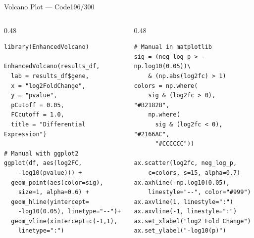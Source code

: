 \documentclass[10pt]{beamer}
\newcommand{\smark}[1]{\hfill{\scriptsize\color{codegray}#1}}
\begin{document}
\begin{frame}[fragile]{Volcano Plot --- Code}\smark{196/300}
\begin{columns}[T]
\begin{column}{0.48\textwidth}
\begin{lstlisting}[style=Rstyle]
library(EnhancedVolcano)

EnhancedVolcano(results_df,
  lab = results_df$gene,
  x = "log2FoldChange",
  y = "pvalue",
  pCutoff = 0.05,
  FCcutoff = 1.0,
  title = "Differential Expression")

# Manual with ggplot2
ggplot(df, aes(log2FC,
    -log10(pvalue))) +
  geom_point(aes(color=sig),
    size=1, alpha=0.6) +
  geom_hline(yintercept=
    -log10(0.05), linetype="--")+
  geom_vline(xintercept=c(-1,1),
    linetype=":")
\end{lstlisting}
\end{column}
\begin{column}{0.48\textwidth}
\begin{lstlisting}[style=Pystyle]
# Manual in matplotlib
sig = (neg_log_p > -np.log10(0.05))\
    & (np.abs(log2fc) > 1)
colors = np.where(
    sig & (log2fc > 0), "#B2182B",
    np.where(
      sig & (log2fc < 0), "#2166AC",
      "#CCCCCC"))

ax.scatter(log2fc, neg_log_p,
    c=colors, s=15, alpha=0.7)
ax.axhline(-np.log10(0.05),
    linestyle="--", color="#999")
ax.axvline(1, linestyle=":")
ax.axvline(-1, linestyle=":")
ax.set_xlabel("log2 Fold Change")
ax.set_ylabel("-log10(p)")
\end{lstlisting}
\end{column}
\end{columns}
\end{frame}
\end{document}
